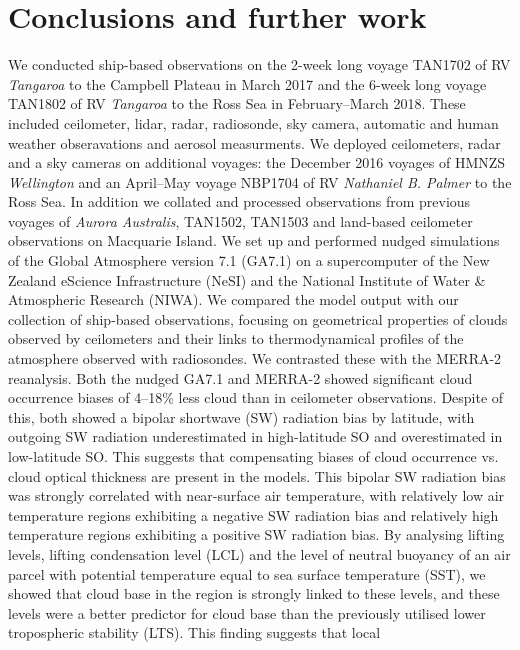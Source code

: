 \chapter{Conclusions and further work}

We conducted ship-based observations on the 2-week long voyage TAN1702 of
RV \textit{Tangaroa} to the Campbell Plateau
in March 2017 and the 6-week long voyage TAN1802 of RV \textit{Tangaroa} to the Ross Sea
in February--March 2018. These included ceilometer, lidar, radar, radiosonde,
sky camera, automatic and human weather obseravations and aerosol measurments.
We deployed ceilometers, radar and a sky cameras on additional voyages:
the December 2016 voyages of HMNZS \textit{Wellington} and an 
April--May voyage NBP1704 of RV \textit{Nathaniel B. Palmer} to the Ross Sea.
In addition we collated and processed observations from previous voyages
of \textit{Aurora Australis}, TAN1502, TAN1503 and land-based ceilometer
observations on Macquarie Island.
We set up and performed nudged simulations
of the Global Atmosphere version 7.1 (GA7.1) on a supercomputer of the New Zealand eScience Infrastructure (NeSI) and the National Institute of Water \& Atmospheric Research (NIWA).
We compared the model output with our collection of ship-based observations,
focusing on geometrical properties of clouds observed by ceilometers and their
links to thermodynamical profiles of the atmosphere observed with radiosondes.
We contrasted these with the MERRA-2 reanalysis. Both the nudged GA7.1 and MERRA-2
showed significant cloud occurrence biases of 4--18\% less cloud than in
ceilometer observations. Despite of this, both showed a bipolar shortwave (SW)
radiation
bias by latitude, with outgoing SW radiation underestimated in high-latitude
SO and overestimated in low-latitude SO. This suggests that compensating biases
of cloud occurrence vs. cloud optical thickness are present in the models.
This bipolar SW radiation bias was strongly correlated with near-surface air temperature,
with relatively low air temperature regions exhibiting a negative SW radiation bias and
relatively high temperature regions exhibiting a positive SW radiation bias. By analysing
lifting levels, lifting condensation level (LCL) and the level of neutral buoyancy
of an air parcel with potential temperature equal to sea surface temperature (SST),
we showed that cloud base in the region is strongly linked to these levels,
and these levels were a better predictor for cloud base than the previously
utilised lower tropospheric stability (LTS). This finding suggests that local
